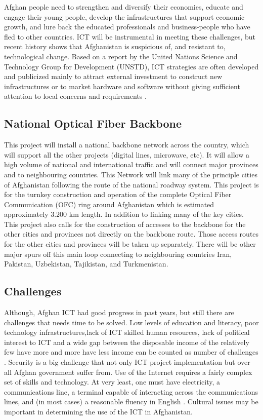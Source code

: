 Afghan people need to strengthen and diversify their economies, educate and engage their young people, develop the infrastructures that support economic growth, and lure back the educated professionals and business-people who have fled to other countries. ICT will be instrumental in meeting these challenges, but recent history shows that Afghanistan is suspicious of, and resistant to, technological change. Based on a report by the United Nations Science and Technology Group for Development (UNSTD), ICT strategies are often developed and publicized mainly to attract external investment to construct new infrastructures or to market hardware and software without giving sufficient attention to local concerns and requirements \cite{afg2}.\\


\subsection{National Optical Fiber Backbone}
This project will install a national backbone network across the country, which will support all the other projects (digital lines, microwave, etc). It will allow a high volume of national and international traffic and will connect major provinces and to neighbouring countries. This Network will link many of the principle cities of Afghanistan following the route of the national roadway system. This project is for the turnkey construction and operation of the complete Optical Fiber Communication (OFC) ring around Afghanistan which is estimated approximately 3.200 km length. In addition to linking many of the key cities. This project also calls for the construction of accesses to the backbone for the other cities and provinces not directly on the backbone route. Those access routes for the other cities and provinces will be taken up separately. There will be other major spurs off this main loop connecting to neighbouring countries Iran, Pakistan, Uzbekistan, Tajikistan, and Turkmenistan.\cite{afg1} 	

\subsection{Challenges}
Although, Afghan ICT had good progress in past years, but still there are challenges that needs time to be solved. Low levels of education and literacy, poor technology infrastructures,lack of ICT skilled human resources, lack of political interest to ICT and a wide gap between the disposable income of the relatively few have more and more have less income can be counted as number of challenges . Security is a big challenge that not only ICT project implementation but over all Afghan government suffer from.  Use of the Internet requires a fairly complex set of skills and technology. At very least, one must have electricity, a communications line, a terminal capable of interacting across the communications lines, and (in most cases) a reasonable fluency in English \cite{afg3}. Cultural issues may be  important in determining the use of the ICT in Afghanistan. 


